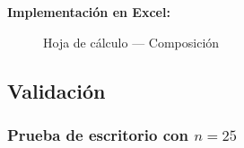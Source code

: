 \documentclass[12pt, a4paper]{article}
\begin{document}
\textbf{Implementación en Excel:}

\begin{figure}[H]
\centering
{}
\caption{Hoja de cálculo — Composición}
\end{figure}

\subsection{Validación}

\subsubsection{\texorpdfstring{Prueba de escritorio con $n=25$}{Prueba de escritorio con n=25}}
\end{document}
